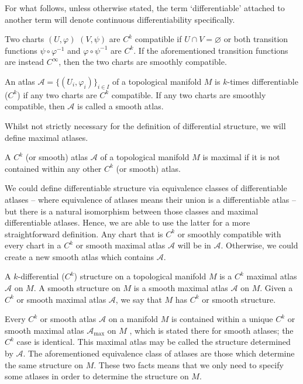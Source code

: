 \documentclass[a4paper,12pt]{article}
\begin{document}
For what follows, unless otherwise stated, the term \enquote*{differentiable} attached to another term will denote continuous differentiability specifically.
\begin{definition}\label{def:compatible_charts}
    Two charts $(U, \varphi)$ $(V, \psi)$ are $C^k$ compatible if $U \cap V = \varnothing$ or both transition functions $\psi \circ \varphi^{-1}$ and $\varphi \circ \psi^{-1}$ are $C^k$.
    If the aforementioned transition functions are instead $C^\infty$, then the two charts are smoothly compatible.
\end{definition}
\begin{definition}\label{def:differentiable_and_smooth_atlas}
    An atlas $\mathcal{A} = \{(U_i, \varphi_i)\}_{i \in I}$ of a topological manifold $M$ is $k$-times differentiable ($C^k$) if any two charts are $C^k$ compatible.
    If any two charts are smoothly compatible, then $\mathcal{A}$ is called a smooth atlas.
\end{definition}
Whilst not strictly necessary for the definition of differential structure, we will define maximal atlases.
\begin{definition}\label{def:maximal_atlas}
    A $C^k$ (or smooth) atlas $\mathcal{A}$ of a topological manifold $M$ is maximal if it is not contained within any other $C^k$ (or smooth) atlas.
\end{definition}
We could define differentiable structure via equivalence classes of differentiable atlases -- where equivalence of atlases means their union is a differentiable atlas -- but there is a natural isomorphism between those classes and maximal differentiable atlases.
Hence, we are able to use the latter for a more straightforward definition.
Any chart that is $C^k$ or smoothly compatible with every chart in a $C^k$ or smooth maximal atlas $\mathcal{A}$ will be in $\mathcal{A}$.
Otherwise, we could create a new smooth atlas which contains $\mathcal{A}$. 
\begin{definition}\label{def:differential_and_smooth_structure}
    A $k$-differential ($C^k$) structure on a topological manifold $M$ is a $C^k$ maximal atlas $\mathcal{A}$ on $M$.
    A smooth structure on $M$ is a smooth maximal atlas $\mathcal{A}$ on $M$.
    Given a $C^k$ or smooth maximal atlas $\mathcal{A}$, we say that $M$ has $C^k$ or smooth structure.
\end{definition}
Every $C^k$ or smooth atlas $\mathcal{A}$ on a manifold $M$ is contained within a unique $C^k$ or smooth maximal atlas $\mathcal{A}_{\text{max}}$ on $M$ \cite[Prop.~1.17]{Lee2012}, which is stated there for smooth atlases; the $C^k$ case is identical.
This maximal atlas may be called the structure determined by $\mathcal{A}$.
The aforementioned equivalence class of atlases are those which determine the same structure on $M$.
These two facts means that we only need to specify some atlases in order to determine the structure on $M$.
\end{document}

